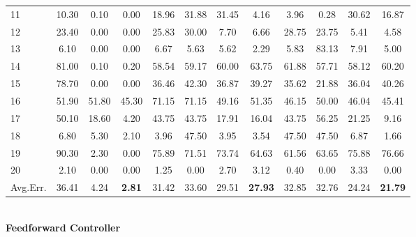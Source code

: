 \documentclass[landscape,a0paper,fontscale=0.285,final]{baposter} %
\begin{document}
\begin{poster}
{{\begin{minipage}[t]{0.94\linewidth}
\begin{tabular}{ | l || c | c | c || c |c |c|c|| c | c | c|c| }
11 & 10.30 & 0.10 & 0.00 & 18.96 & 31.88 & 31.45 & 4.16 & 3.96 & 0.28 & 30.62 & 16.87\\
12 & 23.40 & 0.00 & 0.00 & 25.83 & 30.00 & 7.70 & 6.66 & 28.75 & 23.75 & 5.41 & 4.58\\
13 & 6.10 & 0.00 & 0.00 & 6.67 & 5.63 & 5.62 & 2.29 & 5.83 & 83.13 & 7.91 & 5.00\\
14 & 81.00 & 0.10 & 0.20 & 58.54 & 59.17 & 60.00 & 63.75 & 61.88 & 57.71 & 58.12 & 60.20\\
15 & 78.70 & 0.00 & 0.00 & 36.46 & 42.30 & 36.87 & 39.27 & 35.62 & 21.88 & 36.04 & 40.26\\
16 & 51.90 & 51.80 & 45.30 & 71.15 & 71.15 & 49.16 & 51.35 & 46.15 & 50.00 & 46.04 & 45.41\\
17 & 50.10 & 18.60 & 4.20 & 43.75 & 43.75 & 17.91 & 16.04 & 43.75 & 56.25 & 21.25 & 9.16\\
18 & 6.80 & 5.30 & 2.10 & 3.96 & 47.50 & 3.95 & 3.54 & 47.50 & 47.50 & 6.87 & 1.66\\
19 & 90.30 & 2.30 & 0.00 & 75.89 & 71.51 & 73.74 & 64.63 & 61.56 & 63.65 & 75.88 & 76.66\\
20 & 2.10 & 0.00 & 0.00 & 1.25 & 0.00 & 2.70 & 3.12 & 0.40 & 0.00 & 3.33 & 0.00\\\hline
Avg.Err. & 36.41 & 4.24 & \textbf{2.81} & 31.42 & 33.60 & 29.51 & \textbf{27.93} & 32.85 & 32.76 & 24.24 & \textbf{21.79}\\\hline
\end{tabular}
\end{minipage}}

~\\ {\bf Feedforward Controller \\}

}
\end{poster}
\end{document}
